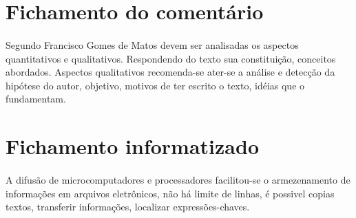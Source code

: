 \section{Fichamento do comentário}

\paragraph{}
Segundo Francisco Gomes de Matos devem ser analisadas os aspectos quantitativos e qualitativos. Respondendo do texto sua constituição, conceitos abordados. Aspectos qualitativos recomenda-se ater-se a análise e detecção da hipótese do autor, objetivo, motivos de ter escrito o texto, idéias que o fundamentam.

\section{Fichamento informatizado}

\paragraph{}
A difusão de microcomputadores e processadores facilitou-se o armezenamento de informações em arquivos eletrônicos, não há limite de linhas, é possivel copias textos, transferir informações, localizar expressões-chaves.